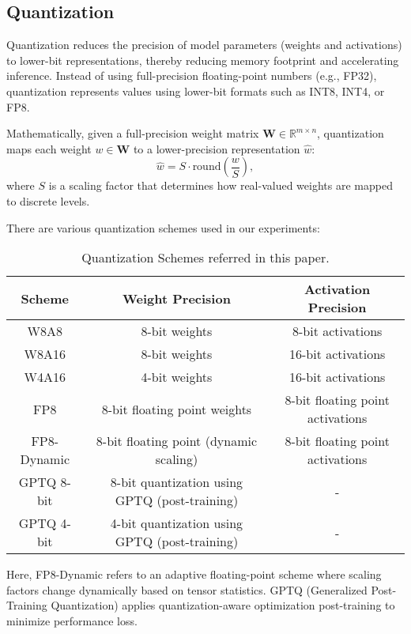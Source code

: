 \subsection{Quantization}

Quantization reduces the precision of model parameters (weights and activations) to lower-bit representations, thereby reducing memory footprint and accelerating inference. Instead of using full-precision floating-point numbers (e.g., FP32), quantization represents values using lower-bit formats such as INT8, INT4, or FP8.\medskip

Mathematically, given a full-precision weight matrix $\mathbf{W} \in \mathbb{R}^{m \times n}$, quantization maps each weight $w \in \mathbf{W}$ to a lower-precision representation $\hat{w}$:
\begin{equation}
    \hat{w} = S \cdot \text{round} \left(\frac{w}{S}\right),
\end{equation}
where $S$ is a scaling factor that determines how real-valued weights are mapped to discrete levels.

There are various quantization schemes used in our experiments:

\begin{table*}[ht]
    \centering

    \begin{tabular}{ccc}
\toprule
        \textbf{Scheme} & \textbf{Weight Precision} & \textbf{Activation Precision} \\
\midrule
        W8A8  & 8-bit weights & 8-bit activations \\
        W8A16 & 8-bit weights & 16-bit activations \\
        W4A16 & 4-bit weights & 16-bit activations \\
        FP8 & 8-bit floating point weights & 8-bit floating point activations \\
        FP8-Dynamic & 8-bit floating point (dynamic scaling) & 8-bit floating point activations \\
        GPTQ 8-bit & 8-bit quantization using GPTQ (post-training) & - \\
        GPTQ 4-bit & 4-bit quantization using GPTQ (post-training) & - \\
\bottomrule
    \end{tabular}
        \caption{Quantization Schemes referred in this paper.}
    \label{tab:quantization}
\end{table*}

Here, FP8-Dynamic refers to an adaptive floating-point scheme where scaling factors change dynamically based on tensor statistics. GPTQ (Generalized Post-Training Quantization) applies quantization-aware optimization post-training to minimize performance loss.

